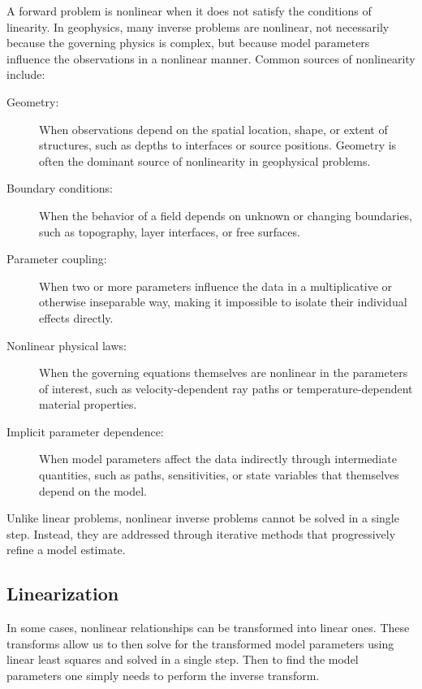 A forward problem is nonlinear when it does not satisfy the conditions of linearity.   In geophysics, many inverse problems are nonlinear, not necessarily because the governing physics is complex, but because model parameters influence the observations in a nonlinear manner.   Common sources of nonlinearity include:
\begin{description}
    \item [Geometry:]
    When observations depend on the spatial location, shape, or extent of structures, such as depths to interfaces or source positions. Geometry is often the dominant source of nonlinearity in geophysical problems.

    \item [Boundary conditions:]
    When the behavior of a field depends on unknown or changing boundaries, such as topography, layer interfaces, or free surfaces.

    \item [Parameter coupling:]
    When two or more parameters influence the data in a multiplicative or otherwise inseparable way, making it impossible to isolate their individual effects directly.

    \item [Nonlinear physical laws:]
    When the governing equations themselves are nonlinear in the parameters of interest, such as velocity-dependent ray paths or temperature-dependent material properties.

    \item [Implicit parameter dependence:]
    When model parameters affect the data indirectly through intermediate quantities, such as paths, sensitivities, or state variables that themselves depend on the model.
\end{description}

Unlike linear problems, nonlinear inverse problems cannot be solved in a single step. Instead, they are addressed through iterative methods that progressively refine a model estimate.

\subsection{Linearization}

In some cases, nonlinear relationships can be transformed into linear ones.  These transforms allow us to then solve for the transformed model parameters using linear least squares and solved in a single step.  Then to find the model parameters one simply needs to perform the inverse transform.

